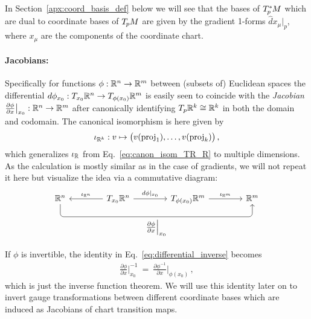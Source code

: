 In Section~\ref{apx:coord_basis_def} below we will see that the bases of $T_{\mkern-1.5mu p}^{\mkern-0mu *}\mkern-1muM$ which are dual to coordinate bases of $T_{\mkern-1.5mu p}\mkern-.5muM$ are given by the gradient 1-forms $\hat{d}x_\mu|_p$, where $x_\mu$ are the components of the coordinate chart.



\paragraph{Jacobians:}
Specifically for functions $\phi: \mathbb{R}^n \to \mathbb{R}^m$ between (subsets of) Euclidean spaces the differential
$d\phi_{x_0}: {T_{x_0}\mathbb{R}^n \to T_{\phi(x_0)}\mathbb{R}^m}$
is easily seen to coincide with the \emph{Jacobian} $\frac{\partial \phi}{\partial x} \big|_{x_0}: \mathbb{R}^n \to \mathbb{R}^m$
after canonically identifying $T_p\mathbb{R}^k \cong \mathbb{R}^k$ in both the domain and codomain.
The canonical isomorphism is here given by
\begin{align}\label{eq:canonical_iso_TRk_Rk}
    \iota_{\mathbb{R}^k}: v \mapsto \big( v(\operatorname{proj}_1), \dots, v(\operatorname{proj}_k) \big) \,,
\end{align}
which generalizes $\iota_{\mathbb{R}}$ from Eq.~\eqref{eq:canon_isom_TR_R} to multiple dimensions.
As the calculation is mostly similar as in the case of gradients, we will not repeat it here but visualize the idea via a commutative diagram:
\begin{equation}\label{cd:jacobian_def}
    \begin{tikzcd}[row sep=2.5em, column sep=4em]
          \R^n
                \arrow[rrr, rounded corners, to path={ 
                        |- node[below, pos=.75]{$\frac{\partial \phi}{\partial x} \Big|_{x_0}$} ([yshift=-3.5ex]\tikztotarget.south)
                        -- (\tikztotarget.south)
                        }]
        & T_{x_0}\R^n
                \arrow[l, "\iota_{\R^n}"']
                \arrow[r, "d\phi |_{x_0}"]
        & T_{\phi(x_0)}\R^m
                \arrow[r, "\iota_{\R^m}"]
        & \R^m
    \end{tikzcd}
\end{equation}

If $\phi$ is invertible, the identity in Eq.~\eqref{eq:differential_inverse} becomes
\begin{align}\label{eq:inv_fct_thm_jacobian}
    \frac{\partial \phi}{\partial x} \bigg|_{x_0}^{-1} \ =\ 
    \frac{\partial \phi^{-1}}{\partial x} \bigg|_{\phi(x_0)} \,,
\end{align}
which is just the inverse function theorem.
We will use this identity later on to invert gauge transformations between different coordinate bases which are induced as Jacobians of chart transition maps.











